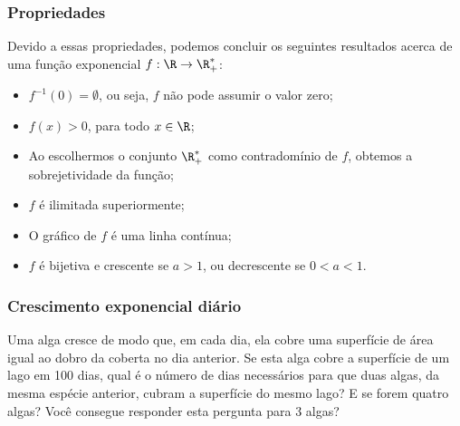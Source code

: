 \begin{frame}
\frametitle{Propriedades} 

Devido a essas propriedades, podemos concluir os seguintes
resultados acerca de uma função exponencial $f: \R \to \R_+^\ast$:
\begin{itemize}
	\item $f^{-1}(0) = \emptyset$, ou seja, $f$ não pode assumir o valor
	zero;
	\item $f(x)>0$, para todo $x \in \R$;
	\item Ao escolhermos o conjunto $\R_+^\ast$ como contradomínio de $f$, obtemos
	a sobrejetividade da função;
	\item $f$ é ilimitada superiormente;
	\item O gráfico de $f$ é uma linha contínua;
	\item $f$ é bijetiva e crescente se $a>1$, ou decrescente se
	$0<a<1$.
\end{itemize}
\end{frame}


\begin{frame}
	\frametitle{Crescimento exponencial diário}

\begin{exemplo}\label{exem-alga}
	Uma alga cresce de modo que, em cada dia, ela cobre uma superfície de área igual ao dobro da coberta no dia anterior. Se esta alga cobre a superfície de um lago em 100 dias, qual é o número de dias necessários para que duas algas, da mesma espécie anterior, cubram a superfície do mesmo lago? E se forem quatro algas? Você consegue responder esta pergunta para 3 algas?
	\end{exemplo}

\end{frame}

